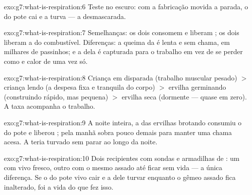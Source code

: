 \begin{solution}{exo:g7:what-is-respiration:6}
Teste no escuro: com a fabricação movida a  parada, o  do
pote cai e a  turva --- a  desmascarada.
\end{solution}

\begin{solution}{exo:g7:what-is-respiration:7}
Semelhanças: os dois consomem  e liberam ; os
dois liberam a  do combustível. Diferenças: a queima da 
é lenta e sem chama, em milhares de passinhos; e a  dela é
capturada para o trabalho em vez de se perder como  e calor de uma
vez só.
\end{solution}

\begin{solution}{exo:g7:what-is-respiration:8}
Criança em disparada (trabalho muscular pesado) $>$ criança lendo (a
despesa fixa e tranquila do corpo) $>$ ervilha germinando (construindo
rápido, mas pequena) $>$ ervilha seca (dormente ---  quase em
zero). A taxa acompanha o trabalho.
\end{solution}

\begin{solution}{exo:g7:what-is-respiration:9}
A noite inteira, a  das ervilhas brotando consumiu o
 do pote e liberou ; pela manhã sobra pouco
 demais para manter uma chama acesa. A  teria
turvado sem parar ao longo da noite.
\end{solution}

\begin{solution}{exo:g7:what-is-respiration:10}
Dois recipientes com sondas e armadilhas de : um com 
vivo fresco, outro com o mesmo  assado até ficar sem vida --- a
única diferença. Se o  do pote vivo cair e a  dele
turvar enquanto o gêmeo assado fica inalterado, foi a vida do  que
fez isso.
\end{solution}

